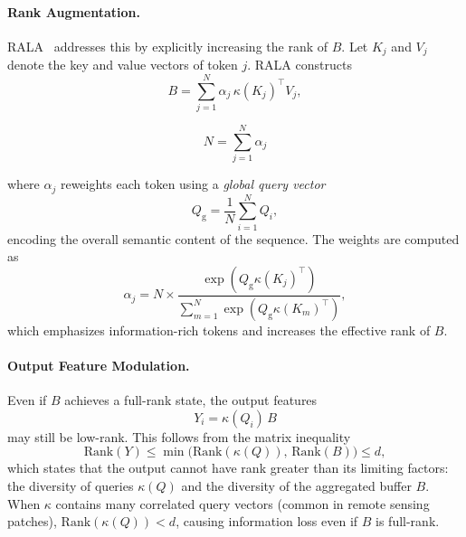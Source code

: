 \paragraph{Rank Augmentation.}
RALA~\cite{Fan2025RALA} addresses this by explicitly increasing the rank of $B$. Let $K_j$ and $V_j$ denote the key and value vectors of token $j$. RALA constructs
\begin{equation}
B=\sum_{j=1}^{N}\alpha_j\,\kappa(K_j)^\top V_j ,
\label{eq:rala_rank_aug}
\end{equation}

\begin{equation}
N=\sum_{j=1}^{N}\alpha_j
\label{eq:rala_alpha_aug}
\end{equation}

\noindent where $\alpha_j$ reweights each token using a \emph{global query vector}
\begin{equation}
Q_{\mathrm{g}}=\frac{1}{N}\sum_{i=1}^N Q_i,
\label{eq:global_query}
\end{equation}
encoding the overall semantic content of the sequence. The weights are computed as
\begin{equation}
\alpha_j=N \times \frac{\exp(Q_{\mathrm{g}}\kappa(K_j)^\top)}
{\sum_{m=1}^{N}\exp(Q_{\mathrm{g}}\kappa(K_m)^\top)},
\label{eq:alpha_softmax}
\end{equation}
which emphasizes information-rich tokens and increases the effective rank of $B$.

\paragraph{Output Feature Modulation.}
Even if $B$ achieves a full-rank state, the output features
\begin{equation}
Y_i=\kappa(Q_i)\,B
\label{eq:Y_pre_modulation}
\end{equation}
may still be low-rank.  
This follows from the matrix inequality
\begin{equation}
\mathrm{Rank}(Y)\le \min\big(\mathrm{Rank}(\kappa(Q)),\,\mathrm{Rank}(B)\big)\le d,
\label{eq:rank_inequality}
\end{equation}
which states that the output cannot have rank greater than its limiting factors: the diversity of queries \(\kappa(Q)\) and the diversity of the aggregated buffer \(B\). When $\kappa$ contains many correlated query vectors (common in remote sensing patches), $\mathrm{Rank}(\kappa(Q))<d$, causing information loss even if $B$ is full-rank.

